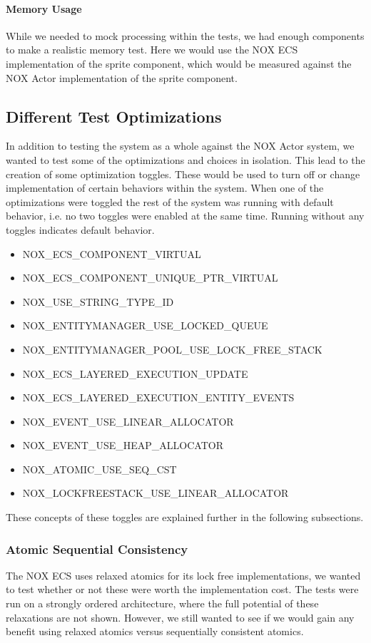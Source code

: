\paragraph{Memory Usage}
While we needed to mock processing within the tests, we had enough components to make a realistic memory test.
Here we would use the NOX ECS implementation of the sprite component, which would be measured against
the NOX Actor implementation of the sprite component.

\subsection{Different Test Optimizations}
In addition to testing the system as a whole against the NOX Actor system, we wanted
to test some of the optimizations and choices in isolation.
This lead to the creation of some optimization toggles.
These would be used to turn off or change implementation of certain behaviors within
the system.
When one of the optimizations were toggled the rest of the system was running with
default behavior, i.e. no two toggles were enabled at the same time.
Running without any toggles indicates default behavior.
\begin{itemize}
    \item NOX\_ECS\_COMPONENT\_VIRTUAL
    \item NOX\_ECS\_COMPONENT\_UNIQUE\_PTR\_VIRTUAL
    \item NOX\_USE\_STRING\_TYPE\_ID
    \item NOX\_ENTITYMANAGER\_USE\_LOCKED\_QUEUE
    \item NOX\_ENTITYMANAGER\_POOL\_USE\_LOCK\_FREE\_STACK
    \item NOX\_ECS\_LAYERED\_EXECUTION\_UPDATE
    \item NOX\_ECS\_LAYERED\_EXECUTION\_ENTITY\_EVENTS
    \item NOX\_EVENT\_USE\_LINEAR\_ALLOCATOR
    \item NOX\_EVENT\_USE\_HEAP\_ALLOCATOR
    \item NOX\_ATOMIC\_USE\_SEQ\_CST
    \item NOX\_LOCKFREESTACK\_USE\_LINEAR\_ALLOCATOR
\end{itemize}
These concepts of these toggles are explained further in the following subsections.

\subsubsection{Atomic Sequential Consistency}
The NOX ECS uses relaxed atomics for its lock free implementations, we wanted to test
whether or not these were worth the implementation cost.
The tests were run on a strongly ordered architecture\cite{preshing_weak_vs_strong_memory_models}, where the
full potential of these relaxations are not shown. However, we still wanted to see
if we would gain any benefit using relaxed atomics versus sequentially consistent atomics.


